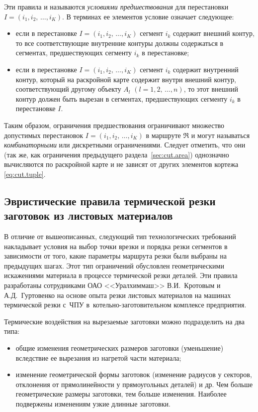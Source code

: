 Эти правила и называются \textit{условиями предшествования}
для перестановки
$ I = (i_1, i_2, \,\dots, i_K)$.
В терминах ее элементов условие означает следующее:
\begin{itemize}
  \item
  если в перестановке
  $ I = (i_1, i_2, \,\dots, i_K)$
  сегмент $i_k$
  содержит внешний контур,
  то все соответствующие внутренние контуры должны содержаться в сегментах,
  предшествующих сегменту $i_k$
  в перестановке;
  \item
  если в перестановке
  $ I = (i_1, i_2, \,\dots, i_K)$
  сегмент $i_k$
  содержит  внутренний контур,
  который на раскройной карте содержит внутри внешний контур,
  соответствующий другому объекту
  $A_l$
  $(l=1,2, \,\dots, n)$,
  то этот внешний контур должен быть вырезан в сегментах,
  предшествующих сегменту $i_k$ в перестановке $I$.
\end{itemize}

Таким образом,
ограничения предшествования ограничивают
множество допустимых перестановок
$ I = (i_1, i_2, \,\dots, i_K)$
в маршруте $\mathfrak R$
и могут называться
\textit{комбинаторными}
или дискретными ограничениями.
Следует отметить,
что они
(так же, как ограничения
предыдущего раздела~\ref{sec:cut.area})
однозначно вычисляются по раскройной карте
и не зависят от других элементов кортежа~
\eqref{eq:cut.tuple}.

\subsection{%
Эвристические правила термической резки заготовок из листовых материалов
}

В отличие от вышеописанных,
следующий тип технологических требований накладывает условия на
выбор точки врезки и порядка резки сегментов в зависимости от того,
какие параметры маршрута резки были выбраны на предыдущих шагах.
Этот тип ограничений обусловлен геометрическими искажениями материала
в процессе термической резки деталей.
Эти правила разработаны сотрудниками ОАО <<Уралхиммаш>>
В.И.~Кротовым и А.Д.~Гуртовенко
на основе опыта резки листовых материалов на машинах термической резки с~ЧПУ
в~котельно-заготовительном комплексе предприятия.

Термические воздействия на вырезаемые заготовки можно подразделить на два типа:
\begin{itemize}
\item
общие изменения геометрических размеров заготовки (уменьшение)
вследствие ее вырезания из нагретой части материала;
\item
изменение геометрической формы заготовок
(изменение радиусов у секторов,
отклонения от прямолинейности у прямоугольных деталей) и др.
Чем больше геометрические размеры заготовки,
тем больше изменения.
Наиболее  подвержены изменениям узкие длинные заготовки.
\end{itemize}

